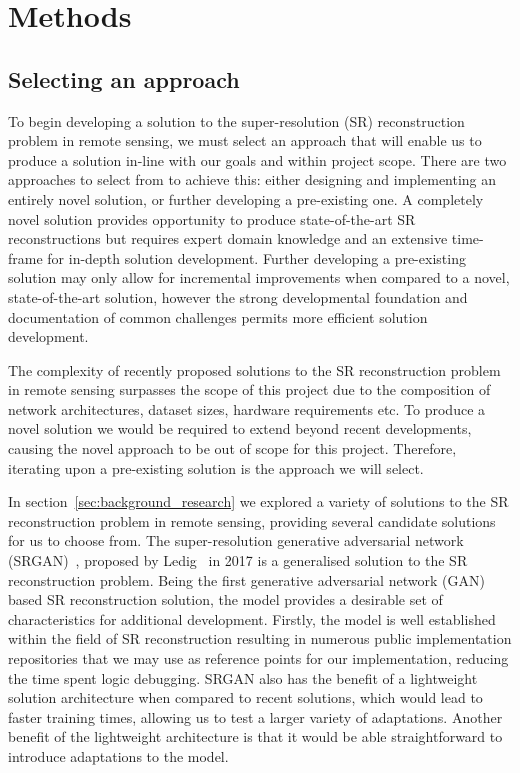 \chapter{Methods}\label{chapter2}
\section{Selecting an approach}\label{sec:selecting_an_approach}
To begin developing a solution to the super-resolution (SR) reconstruction problem in remote sensing, we must select an approach that will enable us to produce a solution in-line with our goals and within project scope. There are two approaches to select from to achieve this: either designing and implementing an entirely novel solution, or further developing a pre-existing one. A completely novel solution provides opportunity to produce state-of-the-art SR reconstructions but requires expert domain knowledge and an extensive time-frame for in-depth solution development. Further developing a pre-existing solution may only allow for incremental improvements when compared to a novel, state-of-the-art solution, however the strong developmental foundation and documentation of common challenges permits more efficient solution development.

The complexity of recently proposed solutions to the SR reconstruction problem in remote sensing surpasses the scope of this project due to the composition of network architectures, dataset sizes, hardware requirements etc. To produce a novel solution we would be required to extend beyond recent developments, causing the novel approach to be out of scope for this project. Therefore, iterating upon a pre-existing solution is the approach we will select.

In section~\ref{sec:background_research} we explored a variety of solutions to the SR reconstruction problem in remote sensing, providing several candidate solutions for us to choose from. The super-resolution generative adversarial network (SRGAN)~\cite{srgan}, proposed by Ledig \etal\ in 2017 is a generalised solution to the SR reconstruction problem. Being the first generative adversarial network (GAN) based SR reconstruction solution, the model provides a desirable set of characteristics for additional development. Firstly, the model is well established within the field of SR reconstruction resulting in numerous public implementation repositories that we may use as reference points for our implementation, reducing the time spent logic debugging. SRGAN also has the benefit of a lightweight solution architecture when compared to recent solutions, which would lead to faster training times, allowing us to test a larger variety of adaptations. Another benefit of the lightweight architecture is that it would be able straightforward to introduce adaptations to the model. 

